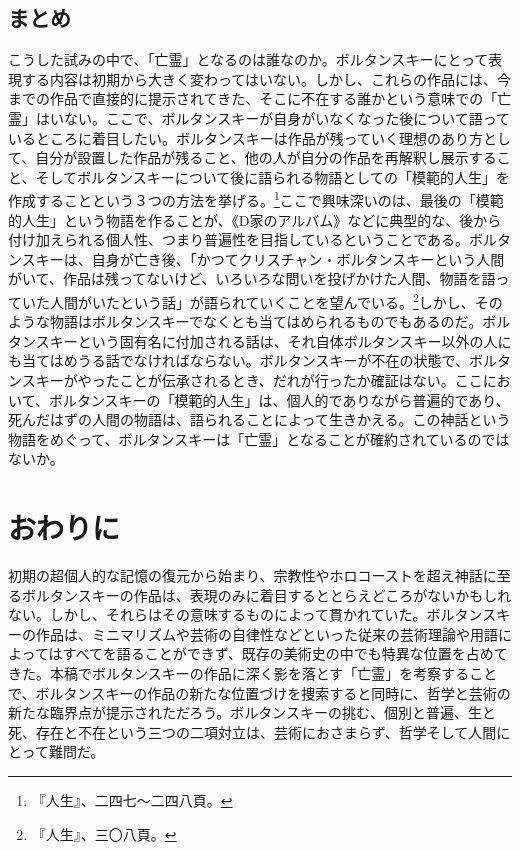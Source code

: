 \documentclass[b5j,twoside,twocolumn]{utarticle}
\begin{document}
\subsection{まとめ}
こうした試みの中で、「亡霊」となるのは誰なのか。ボルタンスキーにとって表現する内容は初期から大きく変わってはいない。しかし、これらの作品には、今までの作品で直接的に提示されてきた、そこに不在する誰かという意味での「亡霊」はいない。ここで、ボルタンスキーが自身がいなくなった後について語っているところに着目したい。ボルタンスキーは作品が残っていく理想のあり方として、自分が設置した作品が残ること、他の人が自分の作品を再解釈し展示すること、そしてボルタンスキーについて後に語られる物語としての「模範的人生」を作成することという３つの方法を挙げる。\footnote{『人生』、二四七～二四八頁。}ここで興味深いのは、最後の「模範的人生」という物語を作ることが、《D家のアルバム》などに典型的な、後から付け加えられる個人性、つまり普遍性を目指しているということである。ボルタンスキーは、自身が亡き後、「かつてクリスチャン・ボルタンスキーという人間がいて、作品は残ってないけど、いろいろな問いを投げかけた人間、物語を語っていた人間がいたという話」が語られていくことを望んでいる。\footnote{『人生』、三〇八頁。}しかし、そのような物語はボルタンスキーでなくとも当てはめられるものでもあるのだ。ボルタンスキーという固有名に付加される話は、それ自体ボルタンスキー以外の人にも当てはめうる話でなければならない。ボルタンスキーが不在の状態で、ボルタンスキーがやったことが伝承されるとき、だれが行ったか確証はない。ここにおいて、ボルタンスキーの「模範的人生」は、個人的でありながら普遍的であり、死んだはずの人間の物語は、語られることによって生きかえる。この神話という物語をめぐって、ボルタンスキーは「亡霊」となることが確約されているのではないか。


\section{おわりに}
初期の超個人的な記憶の復元から始まり、宗教性やホロコーストを超え神話に至るボルタンスキーの作品は、表現のみに着目するととらえどころがないかもしれない。しかし、それらはその意味するものによって貫かれていた。ボルタンスキーの作品は、ミニマリズムや芸術の自律性などといった従来の芸術理論や用語によってはすべてを語ることができず、既存の美術史の中でも特異な位置を占めてきた。本稿でボルタンスキーの作品に深く影を落とす「亡霊」を考察することで、ボルタンスキーの作品の新たな位置づけを捜索すると同時に、哲学と芸術の新たな臨界点が提示されただろう。ボルタンスキーの挑む、個別と普遍、生と死、存在と不在という三つの二項対立は、芸術におさまらず、哲学そして人間にとって難問だ。
\end{document}
